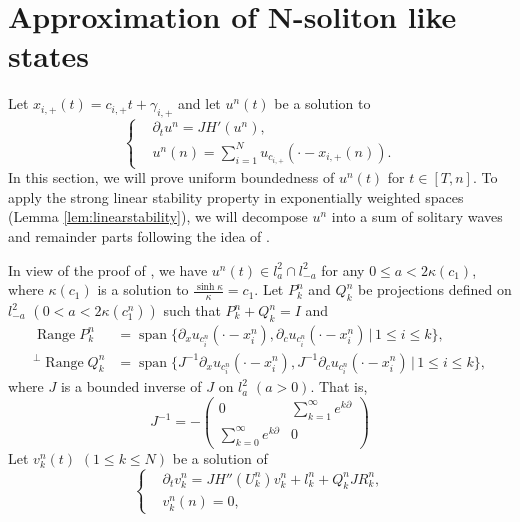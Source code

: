 \documentclass[11pt]{amsart}
\theoremstyle{remark}
\numberwithin{equation}{section}
\begin{document}
\section{Approximation of N-soliton like states}
\label{subsec:2.1}
Let $x_{i,+}(t)=c_{i,+}t+\gamma_{i,+}$ and let
$u^n(t)$ be a solution to
\begin{equation}
  \label{eq:un}
  \left\{    \begin{aligned}
& {\partial}_tu^n=JH'(u^n),\\
& u^n(n)=\sum_{i=1}^Nu_{c_{i,+}}(\cdot-x_{i,+}(n)).
    \end{aligned}\right.
\end{equation}
In this section, we will prove uniform boundedness of $u^n(t)$
for $t\in [T,n]$.
To apply the strong linear stability property in exponentially weighted
spaces (Lemma \ref{lem:linearstability}), we will decompose $u^n$ into a sum of 
solitary waves and remainder parts following the idea of \cite{Mi2}.
\par
In view of the proof of \cite[Proposition 1]{Mi1},
we have $u^n(t)\in l^2_a\cap l^2_{-a}$ for any 
$0\le a<2\kappa(c_1)$, where $\kappa(c_1)$ is a solution to
$\frac{\sinh\kappa}{\kappa}=c_1$.
Let $P_k^n$ and $Q_k^n$ be projections defined on $l^2_{-a}$
$(0<a<2\kappa(c_1^n))$ such that
$P_k^n+Q_k^n=I$ and
\begin{align*}
\operatorname{Range}P_k^n &=\operatorname{span}
\{{\partial}_xu_{c_i^n}(\cdot-x_i^n), {\partial}_cu_{c_i^n}(\cdot-x_i^n)
\,|\, 1\le i\le k\},\\
{}^\perp\operatorname{Range}Q_k^n &=\operatorname{span}\{J^{-1}{\partial}_xu_{c_i^n}(\cdot-x_i^n),
J^{-1}{\partial}_cu_{c_i^n}(\cdot-x_i^n)\,|\,1\le i\le k\},
\end{align*}
where $J$ is a bounded inverse of $J$ on $l^2_a$ $(a>0)$. That is,
\begin{equation}\label{eq:J-1}
J^{-1}= -\begin{pmatrix} 0 & \sum_{k=1}^\infty e^{k{\partial}}
\\ \sum_{k=0}^\infty e^{k{\partial}} & 0 \end{pmatrix}
\end{equation}
Let $v_k^n(t)$ $(1\le k\le N)$ be a solution of 
  \begin{equation}
    \label{eq:vk}
    \left\{\begin{aligned}
& {\partial}_tv_k^n=JH''(U_k^n)v_k^n+l_k^n+Q_k^nJR_k^n,\\
& v_k^n(n)=0,
      \end{aligned}\right.
  \end{equation}
\end{document}
